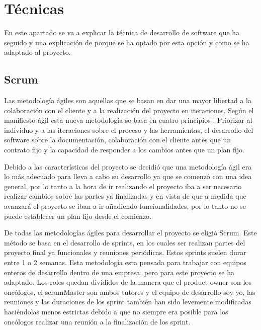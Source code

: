 
\section{Técnicas}

En este apartado se va a explicar la técnica de desarrollo de software que ha seguido y una explicación de porque se ha optado por esta opción y como se ha adaptado al proyecto.

\subsection{Scrum}

Las metodología ágiles son aquellas que se basan en dar una mayor libertad a la colaboración con el cliente y a la realización del proyecto en iteraciones. Según el manifiesto ágil esta nueva metodología se basa en cuatro principios : Priorizar al individuo y a las iteraciones sobre el proceso y las herramientas, el desarrollo del software sobre la documentación, colaboración con el cliente antes que un contrato fijo y la capacidad de responder a los cambios antes que un plan fijo\cite{metodologia_agil}.

Debido a las características del proyecto se decidió que una metodología ágil era lo más adecuado para lleva a cabo su desarrollo ya que se comenzó con una idea general, por lo tanto a la hora de ir realizando el proyecto iba a ser necesario realizar cambios sobre las partes ya finalizadas y en vista de que a medida que avanzará el proyecto se iban a ir añadiendo funcionalidades, por lo tanto no se puede establecer un plan fijo desde el comienzo\cite{metodologia_agil}.

De todas las metodologías ágiles para desarrollar el proyecto se eligió Scrum. Este método se basa en el desarrollo de sprints, en los cuales ser realizan partes del proyecto final ya funcionales y reuniones periódicas. Estos sprints suelen durar entre 1 o 2 semanas\cite{scrum}. Esta metodología esta pensada para trabajar con equipos enteros de desarrollo dentro de una empresa, pero para este proyecto se ha adaptado. Los roles quedan divididos de la manera que el product owner son los oncólogos, el scrumMaster son ambos tutores y el equipo de desarrollo soy yo, las reuniones y las duraciones de los sprint también han sido levemente modificadas haciéndolas menos estrictas debido a que no siempre era posible para los oncólogos realizar una reunión a la finalización de los sprint.

